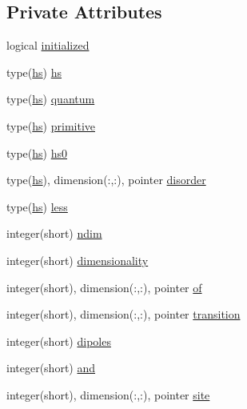 \subsection*{Private Attributes}
\begin{DoxyCompactItemize}
\item 
logical \hyperlink{structdipoles__class_1_1dipoles_a62234fd4a1f98f377becc909912c8785}{initialized}
\item 
type(\hyperlink{strucths__class_1_1hs}{hs}) \hyperlink{structdipoles__class_1_1dipoles_afa2264f1ca48581328e2ab0e1745db4a}{hs}
\item 
type(\hyperlink{strucths__class_1_1hs}{hs}) \hyperlink{structdipoles__class_1_1dipoles_a7b6d2a8feca2c1198896fb10627d029b}{quantum}
\item 
type(\hyperlink{strucths__class_1_1hs}{hs}) \hyperlink{structdipoles__class_1_1dipoles_a56b509ba86b8121570bd7a051cc77fd9}{primitive}
\item 
type(\hyperlink{strucths__class_1_1hs}{hs}) \hyperlink{structdipoles__class_1_1dipoles_a2c208f78e585ed71764e1b37c20be201}{hs0}
\item 
type(\hyperlink{strucths__class_1_1hs}{hs}), dimension(\+:,\+:), pointer \hyperlink{structdipoles__class_1_1dipoles_a8baa5323891d02dede517c209f432c27}{disorder}
\item 
type(\hyperlink{strucths__class_1_1hs}{hs}) \hyperlink{structdipoles__class_1_1dipoles_a0d7a80c3e1a97942236e3e7a1a373cca}{less}
\item 
integer(short) \hyperlink{structdipoles__class_1_1dipoles_a1b540b65199b326d6d477307d646fb1b}{ndim}
\item 
integer(short) \hyperlink{structdipoles__class_1_1dipoles_ae809ff43be02c6f93cd5a6010368a246}{dimensionality}
\item 
integer(short), dimension(\+:,\+:), pointer \hyperlink{structdipoles__class_1_1dipoles_ae6c47d2cab7825bb83f85b624a3acb17}{of}
\item 
integer(short), dimension(\+:,\+:), pointer \hyperlink{structdipoles__class_1_1dipoles_a0b9e590823522c87bb16a014777bc66e}{transition}
\item 
integer(short) \hyperlink{structdipoles__class_1_1dipoles_a2e2a7912feab61f030584442c17fd64b}{dipoles}
\item 
integer(short) \hyperlink{structdipoles__class_1_1dipoles_a7009b45719053d38b8b082f1505127cd}{and}
\item 
integer(short), dimension(\+:,\+:), pointer \hyperlink{structdipoles__class_1_1dipoles_ae35c528d0361b9cd3c1825567339acff}{site}

\end{DoxyCompactItemize}
